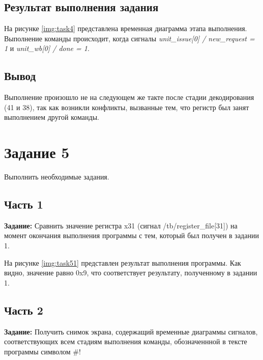 \subsection{Результат выполнения задания}

На рисунке \ref{img:task4} представлена временная диаграмма этапа выполнения. Выполнение команды происходит, когда сигналы \textit{unit\_issue[0] / new\_request = 1} и \textit{unit\_wb[0] / done = 1}.


\clearpage


\subsection{Вывод} 

Выполнение произошло не на следующем же такте после стадии декодирования (41 и 38), так как возникли конфликты, вызванные тем, что регистр был занят выполнением другой команды.



\section{Задание 5}

Выполнить необходимые задания.

\subsection{Часть 1}

\textbf{Задание:} Сравнить значение регистра x31 (сигнал /tb/register\_file[31]) на момент окончания выполнения программы с тем, который был получен в задании 1.

На рисунке \ref{img:task51} представлен результат выполнения программы. Как видно, значение равно 0x9, что соответствует результату, полученному в задании 1.


\clearpage


\subsection{Часть 2}

\textbf{Задание:} Получить снимок экрана, содержащий временные диаграммы сигналов, соответствующих всем стадиям выполнения команды, обозначеннной в тексте программы символом \#!

